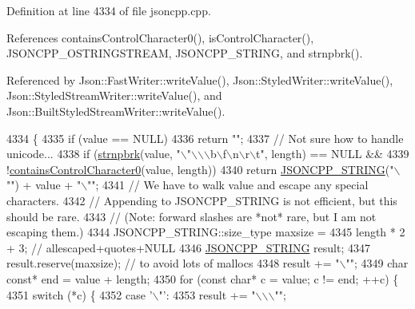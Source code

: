 Definition at line 4334 of file jsoncpp.\+cpp.



References contains\+Control\+Character0(), is\+Control\+Character(), J\+S\+O\+N\+C\+P\+P\+\_\+\+O\+S\+T\+R\+I\+N\+G\+S\+T\+R\+E\+AM, J\+S\+O\+N\+C\+P\+P\+\_\+\+S\+T\+R\+I\+NG, and strnpbrk().



Referenced by Json\+::\+Fast\+Writer\+::write\+Value(), Json\+::\+Styled\+Writer\+::write\+Value(), Json\+::\+Styled\+Stream\+Writer\+::write\+Value(), and Json\+::\+Built\+Styled\+Stream\+Writer\+::write\+Value().


\begin{DoxyCode}
4334                                                                                \{
4335   \textcolor{keywordflow}{if} (value == NULL)
4336     \textcolor{keywordflow}{return} \textcolor{stringliteral}{""};
4337   \textcolor{comment}{// Not sure how to handle unicode...}
4338   \textcolor{keywordflow}{if} (\hyperlink{namespace_json_a7492156d0c7d2dd2f672acacfb240320}{strnpbrk}(value, \textcolor{stringliteral}{"\(\backslash\)"\(\backslash\)\(\backslash\)\(\backslash\)b\(\backslash\)f\(\backslash\)n\(\backslash\)r\(\backslash\)t"}, length) == NULL &&
4339       !\hyperlink{namespace_json_ae8a357381f264cf28f46449e79ab1dea}{containsControlCharacter0}(value, length))
4340     \textcolor{keywordflow}{return} \hyperlink{json_8h_a1e723f95759de062585bc4a8fd3fa4be}{JSONCPP\_STRING}(\textcolor{stringliteral}{"\(\backslash\)""}) + value + \textcolor{stringliteral}{"\(\backslash\)""};
4341   \textcolor{comment}{// We have to walk value and escape any special characters.}
4342   \textcolor{comment}{// Appending to JSONCPP\_STRING is not efficient, but this should be rare.}
4343   \textcolor{comment}{// (Note: forward slashes are *not* rare, but I am not escaping them.)}
4344   JSONCPP\_STRING::size\_type maxsize =
4345       length * 2 + 3; \textcolor{comment}{// allescaped+quotes+NULL}
4346   \hyperlink{json_8h_a1e723f95759de062585bc4a8fd3fa4be}{JSONCPP\_STRING} result;
4347   result.reserve(maxsize); \textcolor{comment}{// to avoid lots of mallocs}
4348   result += \textcolor{stringliteral}{"\(\backslash\)""};
4349   \textcolor{keywordtype}{char} \textcolor{keyword}{const}* end = value + length;
4350   \textcolor{keywordflow}{for} (\textcolor{keyword}{const} \textcolor{keywordtype}{char}* c = value; c != end; ++c) \{
4351     \textcolor{keywordflow}{switch} (*c) \{
4352     \textcolor{keywordflow}{case} \textcolor{charliteral}{'\(\backslash\)"'}:
4353       result += \textcolor{stringliteral}{"\(\backslash\)\(\backslash\)\(\backslash\)""};

\end{DoxyCode}
